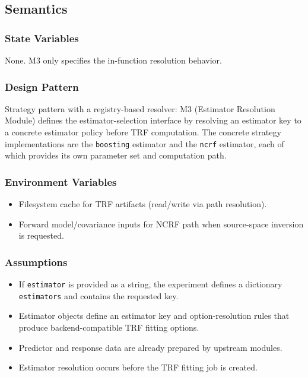 \documentclass[12pt, titlepage]{article}
\begin{document}
\subsection{Semantics}

\subsubsection{State Variables}

None. M3 only specifies the in-function resolution behavior.

\subsubsection{Design Pattern}

Strategy pattern with a registry-based resolver: M3 (Estimator Resolution Module) defines the estimator-selection interface by resolving an estimator key to a concrete estimator policy before TRF computation. The concrete strategy implementations are the \texttt{boosting} estimator and the \texttt{ncrf} estimator, each of which provides its own parameter set and computation path.

\subsubsection{Environment Variables}

\begin{itemize}
\item Filesystem cache for TRF artifacts (read/write via path resolution).
\item Forward model/covariance inputs for NCRF path when source-space inversion
is requested.
\end{itemize}

\subsubsection{Assumptions}

\begin{itemize}
\item If \texttt{estimator} is provided as a string, the experiment defines a
dictionary \texttt{estimators} and contains the requested key.
\item Estimator objects define an estimator key and option-resolution rules that
produce backend-compatible TRF fitting options.
\item Predictor and response data are already prepared by upstream modules.
\item Estimator resolution occurs before the TRF fitting job is created.
\end{itemize}
\end{document}
